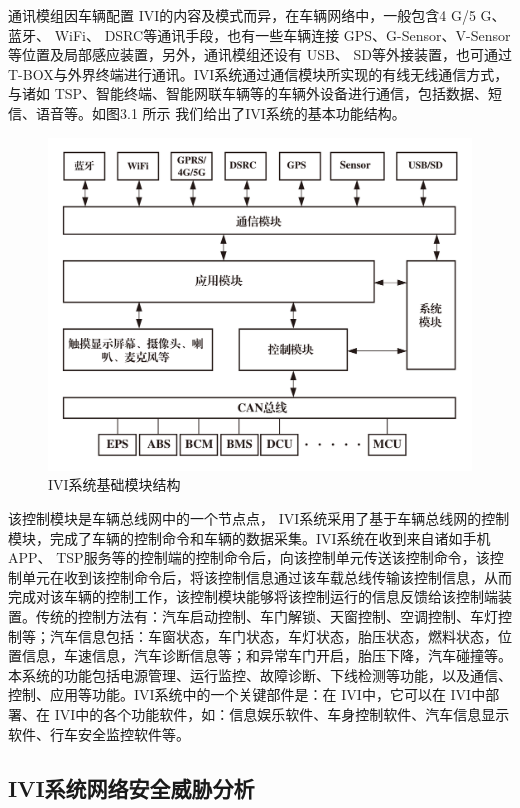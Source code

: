 通讯模组因车辆配置 IVI的内容及模式而异，在车辆网络中，一般包含4 G/5 G、蓝牙、 WiFi、 DSRC等通讯手段，也有一些车辆连接 GPS、G-Sensor、V-Sensor等位置及局部感应装置，另外，通讯模组还设有 USB、 SD等外接装置，也可通过T-BOX与外界终端进行通讯。IVI系统通过通信模块所实现的有线无线通信方式，与诸如 TSP、智能终端、智能网联车辆等的车辆外设备进行通信，包括数据、短信、语音等。如图3.1 所示 我们给出了IVI系统的基本功能结构。
\begin{figure}
  \centering
  \includegraphics[scale=0.4]{resources/img/a50.jpg}
  \caption{IVI系统基础模块结构}
\end{figure}
该控制模块是车辆总线网中的一个节点点， IVI系统采用了基于车辆总线网的控制模块，完成了车辆的控制命令和车辆的数据采集。IVI系统在收到来自诸如手机 APP、 TSP服务等的控制端的控制命令后，向该控制单元传送该控制命令，该控制单元在收到该控制命令后，将该控制信息通过该车载总线传输该控制信息，从而完成对该车辆的控制工作，该控制模块能够将该控制运行的信息反馈给该控制端装置。传统的控制方法有：汽车启动控制、车门解锁、天窗控制、空调控制、车灯控制等；汽车信息包括：车窗状态，车门状态，车灯状态，胎压状态，燃料状态，位置信息，车速信息，汽车诊断信息等；和异常车门开启，胎压下降，汽车碰撞等。
本系统的功能包括电源管理、运行监控、故障诊断、下线检测等功能，以及通信、控制、应用等功能。IVI系统中的一个关键部件是：在 IVI中，它可以在 IVI中部署、在 IVI中的各个功能软件，如：信息娱乐软件、车身控制软件、汽车信息显示软件、行车安全监控软件等。

\subsection{IVI系统网络安全威胁分析}


